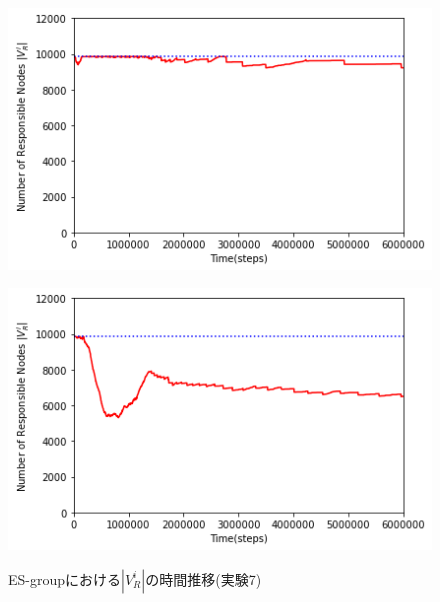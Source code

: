 \documentclass[12pt,a4j,twoside]{jarticle}
\begin{document}
  \begin{figure}
    \begin{minipage}{0.48\hsize}
      \centering
      \includegraphics[width=0.99\hsize]{figures/searchNum_Office_ESgroup_8.png}
      \label{subfig:search_Office_ES_8}
    \end{minipage}
    \hfill
    \begin{minipage}{0.48\hsize}
      \centering
      \includegraphics[width=0.99\hsize]{figures/searchNum_Office_ESgroup_0.png}
      \label{subfig:search_Office_ES_0}
    \end{minipage}
    \caption{ES-groupにおける$|V^i_R|$の時間推移(実験7)}
    \label{fig:search_Office_ES}
  \end{figure}
\end{document}
